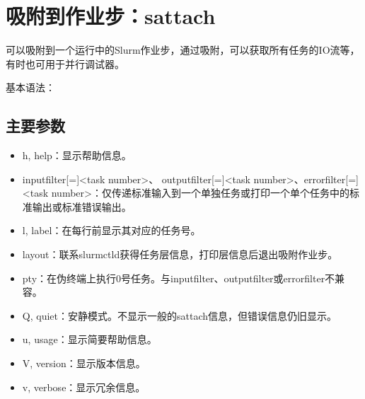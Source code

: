 \documentclass[a4paper,12pt,english]{sphinxmanual}
\begin{document}
\section{吸附到作业步：sattach}
\label{\detokenize{slurm/slurm:sattach}}
\sphinxAtStartPar
{}可以吸附到一个运行中的Slurm作业步，通过吸附，可以获取所有任务的IO流等，有时也可用于并行调试器。

\sphinxAtStartPar
基本语法：


\subsection{主要参数}
\label{\detokenize{slurm/slurm:id42}}\label{\detokenize{slurm/slurm:id43}}\begin{itemize}
\item {} 
\sphinxAtStartPar
\sphinxhyphen{}h, \sphinxhyphen{}\sphinxhyphen{}help：显示帮助信息。

\item {} 
\sphinxAtStartPar
\sphinxhyphen{}\sphinxhyphen{}input\sphinxhyphen{}filter{[}={]}<task number>、 \sphinxhyphen{}\sphinxhyphen{}output\sphinxhyphen{}filter{[}={]}<task number>、\sphinxhyphen{}\sphinxhyphen{}error\sphinxhyphen{}filter{[}={]}<task number>：仅传递标准输入到一个单独任务或打印一个单个任务中的标准输出或标准错误输出。

\item {} 
\sphinxAtStartPar
\sphinxhyphen{}l, \sphinxhyphen{}\sphinxhyphen{}label：在每行前显示其对应的任务号。

\item {} 
\sphinxAtStartPar
\sphinxhyphen{}\sphinxhyphen{}layout：联系slurmctld获得任务层信息，打印层信息后退出吸附作业步。

\item {} 
\sphinxAtStartPar
\sphinxhyphen{}\sphinxhyphen{}pty：在伪终端上执行0号任务。与\sphinxhyphen{}\sphinxhyphen{}input\sphinxhyphen{}filter、\sphinxhyphen{}\sphinxhyphen{}output\sphinxhyphen{}filter或\sphinxhyphen{}\sphinxhyphen{}error\sphinxhyphen{}filter不兼容。

\item {} 
\sphinxAtStartPar
\sphinxhyphen{}Q, \sphinxhyphen{}\sphinxhyphen{}quiet：安静模式。不显示一般的sattach信息，但错误信息仍旧显示。

\item {} 
\sphinxAtStartPar
\sphinxhyphen{}u, \sphinxhyphen{}\sphinxhyphen{}usage：显示简要帮助信息。

\item {} 
\sphinxAtStartPar
\sphinxhyphen{}V, \sphinxhyphen{}\sphinxhyphen{}version：显示版本信息。

\item {} 
\sphinxAtStartPar
\sphinxhyphen{}v, \sphinxhyphen{}\sphinxhyphen{}verbose：显示冗余信息。

\end{itemize}
\end{document}
